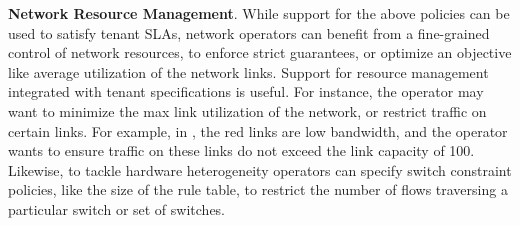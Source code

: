 \begin{compactitemize}
\item \textbf{Network Resource Management}. While support for the above
policies can be used to satisfy tenant SLAs, network operators can
benefit from a fine-grained control of network resources, to enforce
strict guarantees, or optimize an objective like average utilization of the network
links. Support for
resource management integrated with tenant specifications is useful.
For instance, the operator may want to minimize the max link utilization 
of the network, or restrict traffic on certain links. For example, in ,
the red links are low bandwidth, and the operator wants to ensure
traffic on these links do not exceed the link capacity of 100.
  Likewise, to tackle hardware heterogeneity operators can specify
  switch constraint policies, like the size of the rule table, to
  restrict the number of flows traversing a particular switch or set
  of switches.
\end{compactitemize}

